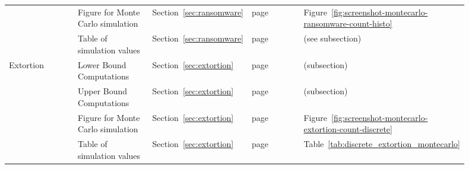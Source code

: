 \begin{table}[H]
\begin{tabular}{@{}p{0.18\linewidth}p{0.18\linewidth}p{0.18\linewidth}p{0.14\linewidth}p{0.22\linewidth}@{}}
    & Figure for Monte Carlo simulation & Section~\ref{sec:ransomware} & page~\pageref{fig:screenshot-montecarlo-ransomware-count-histo} & Figure~\ref{fig:screenshot-montecarlo-ransomware-count-histo} \\
    & Table of simulation values & Section~\ref{sec:ransomware} & page~\pageref{sec:ransomware} & (see subsection) \\
    \midrule
    Extortion & Lower Bound Computations & Section~\ref{sec:extortion} & page~\pageref{sec:extortion} & (subsection) \\
    & Upper Bound Computations & Section~\ref{sec:extortion} & page~\pageref{sec:extortion} & (subsection) \\
    & Figure for Monte Carlo simulation & Section~\ref{sec:extortion} & page~\pageref{fig:screenshot-montecarlo-extortion-count-discrete} & Figure~\ref{fig:screenshot-montecarlo-extortion-count-discrete} \\
    & Table of simulation values & Section~\ref{sec:extortion} & page~\pageref{tab:discrete_extortion_montecarlo} & Table~\ref{tab:discrete_extortion_montecarlo} \\
    \bottomrule
  \end{tabular}
\end{table}

